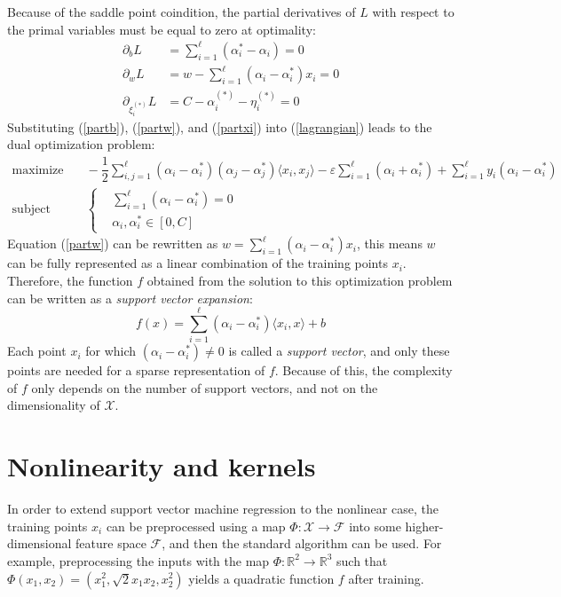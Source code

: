 \documentclass[12pt]{report}
\begin{document}
Because of the saddle point coindition, the partial derivatives of $ L $ with respect to the primal variables must be equal to zero at optimality:
\begin{align}
\label{partb}
\partial_{b}L &= \sum_{i=1}^{\ell}(\alpha_{i}^{*} - \alpha_{i}) = 0 \\
\label{partw}
\partial_{w}L &= w - \sum_{i=1}^{\ell}(\alpha_{i} - \alpha_{i}^{*})x_{i} = 0 \\
\label{partxi}
\partial_{\xi_{i}^{(*)}}L &= C - \alpha_{i}^{(*)} - \eta_{i}^{(*)} = 0
\end{align}
Substituting (\ref{partb}), (\ref{partw}), and (\ref{partxi}) into (\ref{lagrangian}) leads to the dual optimization problem:
\begin{equation} \label{smargdual}
\begin{split}
\text{maximize} &\quad
-\dfrac{1}{2}\sum_{i,j=1}^{\ell}(\alpha_{i} - \alpha_{i}^{*})(\alpha_{j} - \alpha_{j}^{*})\langle x_{i},x_{j} \rangle -\varepsilon\sum_{i=1}^{\ell}(\alpha_{i} + \alpha_{i}^{*}) + \sum_{i=1}^{\ell}y_{i}(\alpha_{i}-\alpha_{i}^{*}) \\
\text{subject to} &\quad \left\{\begin{split}
&\sum_{i=1}^{\ell}(\alpha_{i} - \alpha_{i}^{*}) = 0 \\
&\alpha_{i},\alpha_{i}^{*} \in [0,C]
\end{split}\right.
\end{split}
\end{equation}
Equation (\ref{partw}) can be rewritten as $ w = \sum_{i=1}^{\ell}(\alpha_{i}-\alpha_{i}^{*})x_{i} $, this means $ w $ can be fully represented as a linear combination of the training points $ x_{i} $. Therefore, the function $ f $ obtained from the solution to this optimization problem can be written as a \textit{support vector expansion}:
\begin{equation} \label{fsvexp}
f(x) = \sum_{i=1}^{\ell}(\alpha_{i}-\alpha_{i}^{*})\langle x_{i},x\rangle + b
\end{equation}
Each point $ x_{i} $ for which $ (\alpha_{i}-\alpha_{i}^{*}) \neq 0 $ is called a \textit{support vector}, and only these points are needed for a sparse representation of $ f $.  Because of this, the complexity of $ f $ only depends on the number of support vectors, and not on the dimensionality of $ \mathcal{X} $.

\section{Nonlinearity and kernels}
In order to extend support vector machine regression to the nonlinear case, the training points $ x_{i} $ can be preprocessed using a map $ \Phi : \mathcal{X} \rightarrow \mathcal{F} $ into some higher-dimensional feature space $ \mathcal{F} $, and then the standard algorithm can be used. For example, preprocessing the inputs with the map $ \Phi : \mathbb{R}^{2} \rightarrow \mathbb{R}^{3} $ such that $ \Phi(x_{1},x_{2}) = (x_{1}^{2},\sqrt{2}x_{1}x_{2},x_{2}^{2}) $ yields a quadratic function $ f $ after training.
\end{document}
